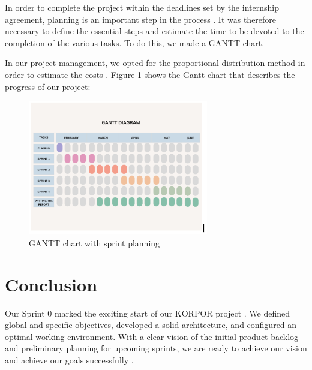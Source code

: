 In order to complete the project within the deadlines set by the internship agreement, planning is an important step in the process \cite{SutherlandScrum2020, RubinEssentialScrum2012}. It was therefore necessary to define the essential steps and estimate the time to be devoted to the completion of the various tasks. To do this, we made a GANTT chart.

In our project management, we opted for the proportional distribution method in order to estimate the costs \cite{CohnAgileEstimating2005, GreningPlanningPoker2002}.
Figure \ref{fig:gantt-chart} shows the Gantt chart that describes the progress of our project:
\newpage

\begin{figure}[htbp]
    \centering
    \includegraphics[width=0.7\textwidth]{images/gantt-chart.png}
    \caption{GANTT chart with sprint planning}
    \label{fig:gantt-chart}
\end{figure}


\section*{Conclusion}

Our Sprint 0 marked the exciting start of our KORPOR project \cite{ScaledAgileFramework2024, SutherlandScrum2020}. We defined global and specific objectives, developed a solid architecture, and configured an optimal working environment. With a clear vision of the initial product backlog and preliminary planning for upcoming sprints, we are ready to achieve our vision and achieve our goals successfully \cite{SchwarzScrum2019, RubinEssentialScrum2012}.

